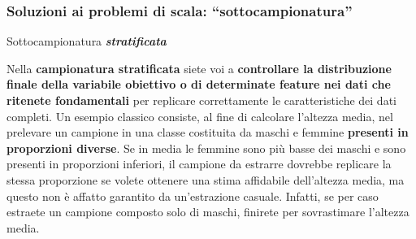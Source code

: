 \begin{frame}
	
	\frametitle{Soluzioni ai problemi di scala: {\color{GradientDescentDiagramBlue}``sottocampionatura''}}
	
	\begin{block}{Sottocampionatura \textit{\textbf{stratificata}}}
		
		Nella \textbf{campionatura stratificata} siete voi a \textbf{controllare la distribuzione finale della variabile obiettivo o di determinate feature nei dati che ritenete fondamentali} per replicare correttamente le caratteristiche dei dati completi. Un esempio classico consiste, al fine di calcolare l’altezza media, nel prelevare un campione in una classe costituita da maschi e femmine \textbf{presenti in proporzioni diverse}.
		\newlinedouble
		Se in media le femmine sono più basse dei maschi e sono presenti in proporzioni inferiori, il campione da estrarre dovrebbe replicare la stessa proporzione se volete ottenere una stima affidabile dell’altezza media, ma questo non è affatto garantito da un’estrazione casuale. Infatti, se per caso estraete un campione composto solo di maschi, finirete per sovrastimare l’altezza media.
		
	\end{block}

\end{frame}


